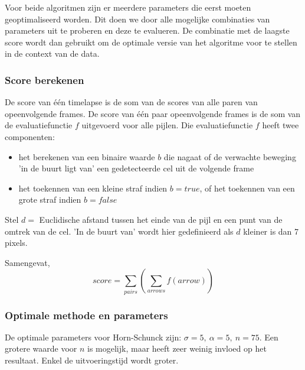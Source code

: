 \documentclass{article}
\begin{document}
\begin{multicols}{2}
Voor beide algoritmen zijn er meerdere parameters die eerst moeten geoptimaliseerd worden. Dit doen we door alle mogelijke combinaties van parameters uit te proberen en deze te evalueren. De combinatie met de laagste score wordt dan gebruikt om de optimale versie van het algoritme voor te stellen in de context van de data.

\subsubsection{Score berekenen}
\label{sec:optflow_score_calc}
De score van één timelapse is de som van de scores van alle paren van opeenvolgende frames. De score van één paar opeenvolgende frames is de som van de evaluatiefunctie $f$ uitgevoerd voor alle pijlen.
Die evaluatiefunctie $f$ heeft twee componenten:
\begin{itemize}
    \item het berekenen van een binaire waarde $b$ die nagaat of de verwachte beweging 'in de buurt ligt van' een gedetecteerde cel uit de volgende frame
    \item het toekennen van een kleine straf indien $b=true$, of het toekennen van een grote straf indien $b=false$
\end{itemize}
Stel $d = $ Euclidische afstand tussen het einde van de pijl en een punt van de omtrek van de cel. 'In de buurt van' wordt hier gedefinieerd als $d$ kleiner is dan 7 pixels.

\noindent Samengevat, \[score = \sum_{pairs}^{}(\sum_{arrows}^{}f(arrow))\]


\subsubsection{Optimale methode en parameters}
\label{sec:opt_flow_opt_parameters}
De optimale parameters voor Horn-Schunck zijn: $\sigma = 5,\ \alpha = 5,\ n = 75$. Een grotere waarde voor $n$ is mogelijk, maar heeft zeer weinig invloed op het resultaat. Enkel de uitvoeringstijd wordt groter.


\end{multicols}
\end{document}
